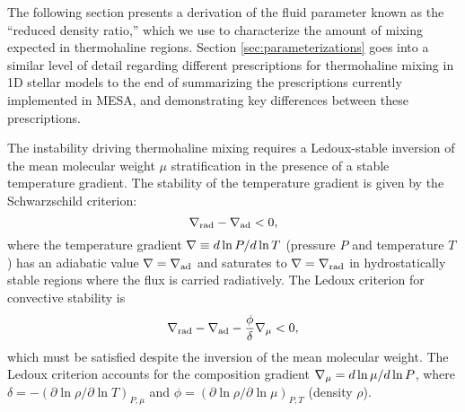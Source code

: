 
The following section presents a derivation of the fluid parameter known as the ``reduced density ratio,'' which we use to characterize the amount of mixing expected in thermohaline regions.  
Section \ref{sec:parameterizations} goes into a similar level of detail regarding different prescriptions for thermohaline mixing in 1D stellar models 
to the end of summarizing the prescriptions currently implemented in MESA, and demonstrating key differences between these prescriptions.


%
The instability driving thermohaline mixing requires a Ledoux-stable inversion of the mean molecular weight $\mu$ stratification in the presence of a stable temperature gradient. 
The stability of the temperature gradient is given by the Schwarzschild criterion:
\begin{equation} \label{eq:Schwarzschild}
    \gradrad - \gradad < 0,
\end{equation}
where the temperature gradient $\nabla \equiv d \ln P / d \ln T$ (pressure $P$ and temperature $T$) has an adiabatic value $\nabla = \nabla_{\rm{ad}}$ and saturates to $\nabla = \nabla_{\rm{rad}}$ in hydrostatically stable regions where the flux is carried radiatively. 
The Ledoux criterion for convective stability is \citep{Ledoux1947}
\begin{equation} \label{eq:Ledoux}
    \gradrad - \gradad - \frac{\phi}{\delta}\gradmu < 0,
\end{equation}
which must be satisfied despite the inversion of the mean molecular weight.
The Ledoux criterion accounts for the composition gradient $\nabla_{\mu} = d\ln\mu/d\ln P$, where $\delta = -(\partial \ln \rho / \partial \ln T)_{P,\mu}$ and $\phi = (\partial \ln \rho / \partial \ln\mu)_{P,T}$ (density $\rho$).

